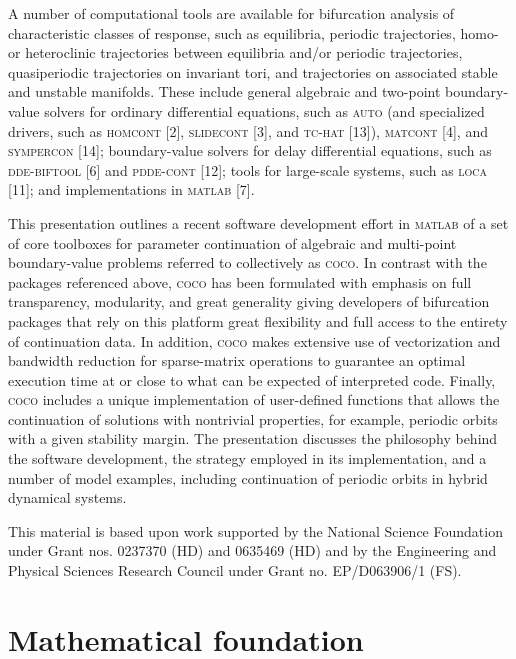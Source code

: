 \documentclass{article}
\begin{document}
A number of computational tools are available for bifurcation analysis of
characteristic classes of response, such as equilibria, periodic
trajectories, homo- or heteroclinic trajectories between equilibria and/or
periodic trajectories, quasiperiodic trajectories on invariant tori, and
trajectories on associated stable and unstable manifolds. These include
general algebraic and two-point boundary-value solvers for ordinary
differential equations, such as \textsc{auto} (and specialized drivers, such
as \textsc{homcont} [2], \textsc{slidecont} [3], and \textsc{tc-hat} [13]), 
\textsc{matcont} [4], and \textsc{sympercon} [14]; boundary-value solvers
for delay differential equations, such as \textsc{dde-biftool} [6] and 
\textsc{pdde-cont} [12]; tools for large-scale systems, such as \textsc{loca}
[11]; and implementations in \textsc{matlab} [7].

This presentation outlines a recent software development effort in \textsc{%
matlab} of a set of core toolboxes for parameter continuation of algebraic
and multi-point boundary-value problems referred to collectively as \textsc{%
coco}. In contrast with the packages referenced above, \textsc{coco} has
been formulated with emphasis on full transparency, modularity, and great
generality giving developers of bifurcation packages that rely on this
platform great flexibility and full access to the entirety of continuation
data. In addition, \textsc{coco} makes extensive use of vectorization and
bandwidth reduction for sparse-matrix operations to guarantee an optimal
execution time at or close to what can be expected of interpreted code.
Finally, \textsc{coco} includes a unique implementation of user-defined
functions that allows the continuation of solutions with nontrivial
properties, for example, periodic orbits with a given stability margin. The
presentation discusses the philosophy behind the software development, the
strategy employed in its implementation, and a number of model examples,
including continuation of periodic orbits in hybrid dynamical systems.

This material is based upon work supported by the National Science
Foundation under Grant nos. 0237370 (HD) and 0635469 (HD) and by the
Engineering and Physical Sciences Research Council under Grant no.
EP/D063906/1 (FS).

\section{Mathematical foundation}
\end{document}
